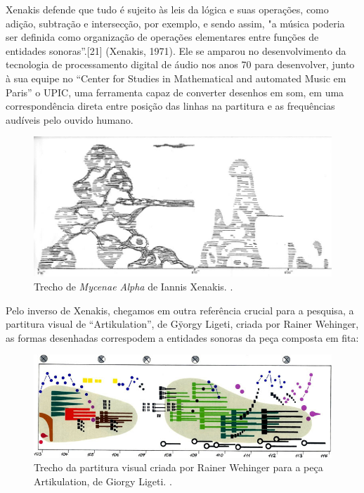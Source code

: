 Xenakis defende que tudo é sujeito às leis da lógica e suas operações, como adição, subtração e intersecção, por exemplo, e sendo assim, "a música poderia ser definida como organização de operações elementares entre funções de entidades sonoras”.[21] (Xenakis, 1971). Ele se amparou no desenvolvimento da tecnologia de processamento digital de áudio nos anos 70 para desenvolver, junto à sua equipe no ``Center for Studies in Mathematical and automated Music em Paris'' o UPIC, uma ferramenta capaz de converter desenhos em som, em uma correspondência direta entre posição das linhas na partitura e as frequências audíveis pelo ouvido humano.


\begin{figure}
    \caption{\label{xenakis}Trecho de \textit{Mycenae Alpha} de Iannis Xenakis.
.}
    
        \includegraphics[width=1\linewidth]{pictures/cap2/metastasis}
    
\end{figure}

Pelo inverso de Xenakis, chegamos em outra referência crucial para a pesquisa, a partitura visual de ``Artikulation'', de Gÿorgy Ligeti, criada por Rainer Wehinger, as formas desenhadas correspodem a entidades sonoras da peça composta em fita:

\begin{figure}
    \caption{\label{ligeti}Trecho da partitura visual criada por Rainer Wehinger para a peça Artikulation, de Giorgy Ligeti.
.}
    
        \includegraphics[width=1\linewidth]{pictures/cap2/ligeti}
    
\end{figure}

